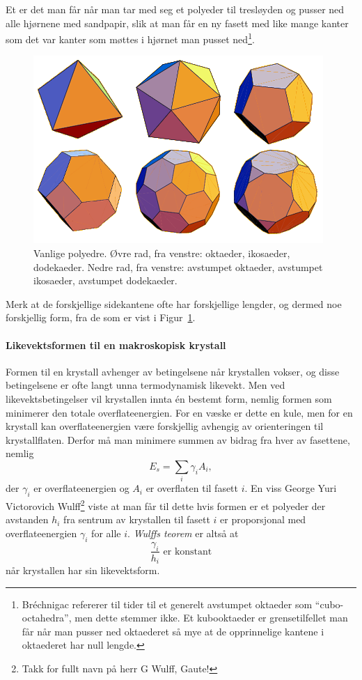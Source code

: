Et  er det man får når man tar med seg et polyeder til tresløyden og pusser ned alle hjørnene med sandpapir, slik at man får en ny fasett med like mange kanter som det var kanter som møttes i hjørnet man pusset ned\footnote{Bréchnigac refererer til tider til et generelt avstumpet oktaeder som ``cubo-octahedra'', men dette stemmer ikke. Et kubooktaeder er grensetilfellet man får når man pusser ned oktaederet så mye at de opprinnelige kantene i oktaederet har null lengde.}.
\begin{figure}[H]
	\bmd\centering
	\includegraphics[width=\linewidth]{polyhedra3.png}
	\caption{Vanlige polyedre. Øvre rad, fra venstre: oktaeder, ikosaeder, dodekaeder. Nedre rad, fra venstre: avstumpet oktaeder, avstumpet ikosaeder, avstumpet dodekaeder.}
	\label{fig:polyhedra}
\emd\end{figure}
Merk at de forskjellige sidekantene ofte har forskjellige lengder, og dermed noe forskjellig form, fra de som er vist i Figur~\ref{fig:polyhedra}.

\paragraph{Likevektsformen til en makroskopisk krystall} Formen til en krystall avhenger av betingelsene når krystallen vokser, og disse betingelsene er ofte langt unna termodynamisk likevekt. Men ved likevektsbetingelser vil krystallen innta én bestemt form, nemlig formen som minimerer den totale overflateenergien. For en væske er dette en kule, men for en krystall kan overflateenergien være forskjellig avhengig av orienteringen til krystallflaten. Derfor må man minimere summen av bidrag fra hver av fasettene, nemlig
\begin{equation}
	E_s = \sum_i \gamma_iA_i,
\end{equation}
der $\gamma_i$ er overflateenergien og $A_i$ er overflaten til fasett $i$. En viss George Yuri Victorovich Wulff\footnote{Takk for fullt navn på herr G Wulff, Gaute!} viste at man får til dette hvis formen er et polyeder der avstanden $h_i$ fra sentrum av krystallen til fasett $i$ er proporsjonal med overflateenergien $\gamma_i$ for alle $i$. \emph{Wulffs teorem} er altså at
\begin{equation}
	\frac{\gamma_i}{h_i} \text{ er konstant}
\end{equation}
når krystallen har sin likevektsform. 

